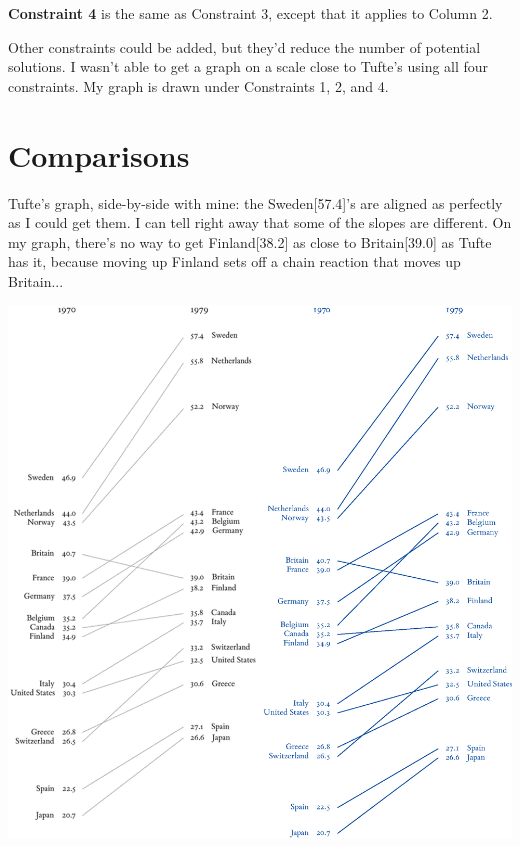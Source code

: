 \documentclass[12pt,twoside]{extarticle}
\begin{document}
{\begin{minipage}[t]{0.53\textwidth}
\textbf{Constraint 4} is the same as Constraint 3, except that it applies to Column 2. 


Other constraints could be added, but they'd reduce the number of potential solutions.  I wasn't able to get a graph on a scale close to Tufte's using all four constraints.  My graph is drawn under Constraints 1, 2, and 4. 
\end{minipage}}
\newpage
\noindent
\begin{minipage}[]{1\textwidth}
\section{Comparisons}
Tufte's graph, side-by-side with \textcolor{myblue}{mine}:  the Sweden[57.4]'s are aligned as perfectly as I could get them.  I can tell right away that some of the slopes are different.  On my graph, there's no way to get Finland[38.2] as close to Britain[39.0] as Tufte has it, because moving up Finland sets off a chain reaction that moves up Britain...
\end{minipage}%
\hfill
\vspace{1.5em}
\includegraphics[]{TuftesVsMineSBS.eps}
\newpage
\noindent
\end{document}
